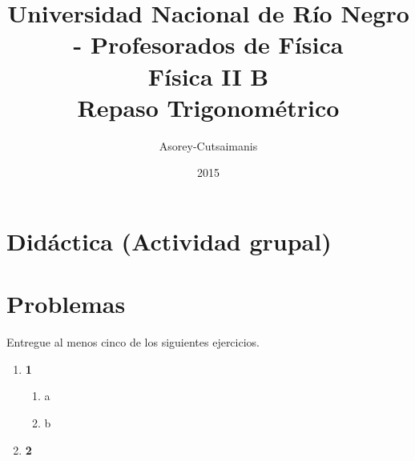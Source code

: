 \documentclass[a4paper,12pt]{article}
\begin{document}
\title{
{\normalsize{Universidad Nacional de Río Negro - Profesorados de Física}}\\
Física II B \\ Repaso Trigonométrico\\}
\author{Asorey-Cutsaimanis}
\date{2015}
\maketitle

\section{Didáctica (Actividad grupal)}

\section{Problemas}

Entregue al menos cinco de los siguientes ejercicios. 

\begin{enumerate}
	\item {\bf{1}}
		\begin{enumerate}
			\item a
			\item b
		\end{enumerate}
	\item {\bf{2}}
\end{enumerate}
\end{document}
